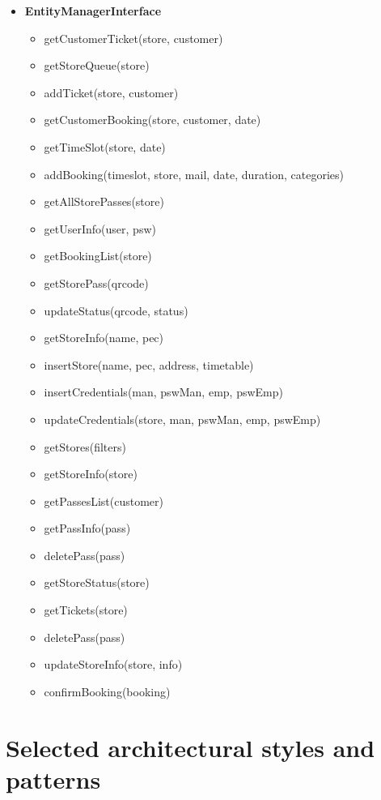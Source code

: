 \begin{itemize}
	\item \textbf{EntityManagerInterface}
	\begin{itemize}
		\item getCustomerTicket(store, customer)
		\item getStoreQueue(store)
		\item addTicket(store, customer)
		\item getCustomerBooking(store, customer, date)
		\item getTimeSlot(store, date)
		\item addBooking(timeslot, store, mail, date, duration, categories)
		\item getAllStorePasses(store)
		\item getUserInfo(user, psw)
		\item getBookingList(store)
		\item getStorePass(qrcode)
		\item updateStatus(qrcode, status)
		\item getStoreInfo(name, pec)
		\item insertStore(name, pec, address, timetable)
		\item insertCredentials(man, pswMan, emp, pswEmp)
		\item updateCredentials(store, man, pswMan, emp, pswEmp)
		\item getStores(filters)
		\item getStoreInfo(store)
		\item getPassesList(customer)
		\item getPassInfo(pass)
		\item deletePass(pass)
		\item getStoreStatus(store)
		\item getTickets(store)
		\item deletePass(pass)
		\item updateStoreInfo(store, info)
		\item confirmBooking(booking)
	\end{itemize}
\end{itemize}

\clearpage

\section{Selected architectural styles and patterns}


